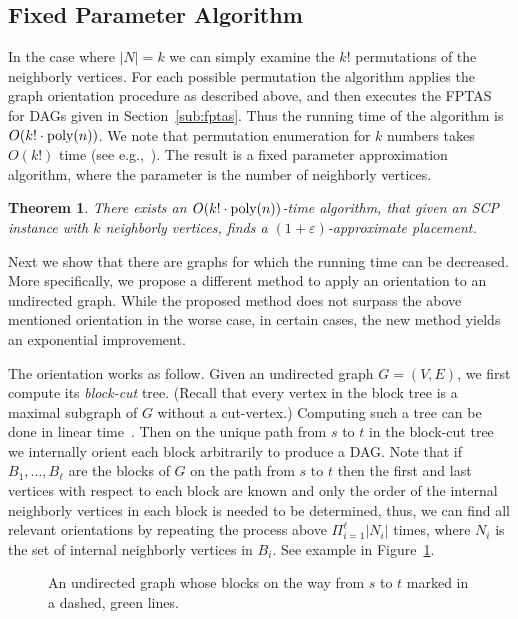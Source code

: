 \documentclass[11pt]{article}
\newtheorem{theorem}{Theorem}
\newcommand{\abs}[1]{\left| #1 \right|}
\newcommand{\eps}{\varepsilon}
\newcommand{\scp}{\textsc{SCP}\xspace}
\begin{document}

\subsection{Fixed Parameter Algorithm}

In the case where $\abs{N} = k$ we can simply examine the $k!$
permutations of the neighborly vertices.  For each possible
permutation the algorithm applies the graph orientation procedure as
described above, and then executes the FPTAS for DAGs given in
Section~\ref{sub:fptas}.  
Thus the running time of the algorithm is $O(k! \cdot \text{\rm poly}(n))$.
%
We note that permutation enumeration for $k$ numbers takes $O(k!)$
time (see e.g.,~\cite{Even73,Sedgewick77}).
%
The result is a fixed parameter approximation algorithm, where the
parameter is the number of neighborly vertices.

\begin{theorem}
There exists an $O(k! \cdot \text{\rm poly}(n))$-time algorithm, that
given an \scp instance with $k$ neighborly vertices, finds a
$(1+\eps)$-approximate placement.
\end{theorem}

Next we show that there are graphs for which the running time can be
decreased.  More specifically, we propose a different method to apply
an orientation to an undirected graph.  While the proposed method does
not surpass the above mentioned orientation in the worse case, in
certain cases, the new method yields an exponential improvement.

The orientation works as follow.  Given an undirected graph $G =
(V,E)$, we first compute its \emph{block-cut} tree.  (Recall that
every vertex in the block tree is a maximal subgraph of $G$ without a
cut-vertex.)  Computing such a tree can be done in linear
time~\cite{HopcroftTarjan73}.
%
Then on the unique path from $s$ to $t$ in the block-cut tree we
internally orient each block arbitrarily to produce a DAG.  Note that
if $B_1, \ldots, B_\ell$ are the blocks of $G$ on the path from $s$ to
$t$ then the first and last vertices with respect to each block are
known and only the order of the internal neighborly vertices in each
block is needed to be determined, thus, we can find all relevant
orientations by repeating the process above $\Pi_{i = 1}^\ell
\abs{N_i}$ times, where $N_i$ is the set of internal neighborly
vertices in $B_i$.  See example in Figure~\ref{fig:or2}.

\begin{figure}[t]
\begin{center}

\end{center}
\caption{An undirected graph whose blocks on the way from $s$ to $t$
  marked in a dashed, green lines.
\label{fig:or2}
}
\end{figure}   
\end{document}
